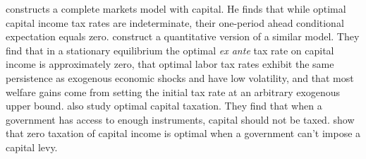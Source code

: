 \documentclass[12pt]{article}
\begin{document}
\citet{zhu1992optimal}
constructs  a  complete markets model  with   capital. He finds that while optimal capital income tax rates are indeterminate,  their one-period ahead  conditional expectation equals zero. 
\citet{chari1994optimal} construct a  quantitative version of a similar model. They  
  find that in a stationary equilibrium the optimal {\em ex ante} tax rate on capital income is approximately zero, that optimal  labor tax rates exhibit the same persistence as exogenous economic shocks and have low volatility,  and that  most welfare gains come from setting the  initial tax rate at an arbitrary exogenous upper bound. %
%
%
%
\citet{chari2020optimal}
 also study optimal capital taxation. They find  that when a government has access to enough   instruments, capital should not be taxed. %
\citet{barro2024taxation} show  that zero taxation of capital income is optimal when a government can't impose a capital levy. 
%
\end{document}
